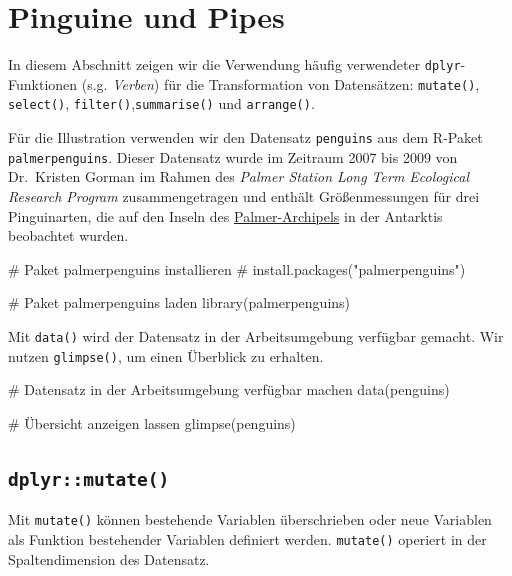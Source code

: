 \documentclass[
  a4paper,
  DIV=11,
  oneside]{scrreprt}
\newenvironment{Shaded}{\begin{snugshade}}{\end{snugshade}}
\newcommand{\CommentTok}[1]{\textcolor[rgb]{0.37,0.37,0.37}{#1}}
\newcommand{\FunctionTok}[1]{\textcolor[rgb]{0.28,0.35,0.67}{#1}}
\newcommand{\NormalTok}[1]{\textcolor[rgb]{0.00,0.23,0.31}{#1}}
\begin{document}
\section{Pinguine und Pipes}\label{pinguine-und-pipes}

In diesem Abschnitt zeigen wir die Verwendung häufig verwendeter
\texttt{dplyr}-Funktionen (s.g. \emph{Verben}) für die Transformation
von Datensätzen: \texttt{mutate()}, \texttt{select()},
\texttt{filter()},\texttt{summarise()} und \texttt{arrange()}.

Für die Illustration verwenden wir den Datensatz \texttt{penguins} aus
dem R-Paket \texttt{palmerpenguins}. Dieser Datensatz wurde im Zeitraum
2007 bis 2009 von Dr.~Kristen Gorman im Rahmen des \emph{Palmer Station
Long Term Ecological Research Program} zusammengetragen und enthält
Größenmessungen für drei Pinguinarten, die auf den Inseln des
\href{https://en.wikipedia.org/wiki/Palmer_Archipelago}{Palmer-Archipels}
in der Antarktis beobachtet wurden.

\begin{Shaded}
\begin{Highlighting}[]
\CommentTok{\# Paket \textquotesingle{}palmerpenguins\textquotesingle{} installieren}
\CommentTok{\# install.packages("palmerpenguins")}

\CommentTok{\# Paket \textquotesingle{}palmerpenguins\textquotesingle{} laden}
\FunctionTok{library}\NormalTok{(palmerpenguins)}
\end{Highlighting}
\end{Shaded}

Mit \texttt{data()} wird der Datensatz in der Arbeitsumgebung verfügbar
gemacht. Wir nutzen \texttt{glimpse()}, um einen Überblick zu erhalten.

\begin{Shaded}
\begin{Highlighting}[]
\NormalTok{\# Datensatz in der Arbeitsumgebung verfügbar machen}
\NormalTok{data(penguins)}

\NormalTok{\# Übersicht anzeigen lassen}
\NormalTok{glimpse(penguins)}
\end{Highlighting}
\end{Shaded}

\subsection{\texorpdfstring{\texttt{dplyr::mutate()}}{dplyr::mutate()}}\label{dplyrmutate}

Mit \texttt{mutate()} können bestehende Variablen überschrieben oder
neue Variablen als Funktion bestehender Variablen definiert werden.
\texttt{mutate()} operiert in der Spaltendimension des Datensatz.
\end{document}
